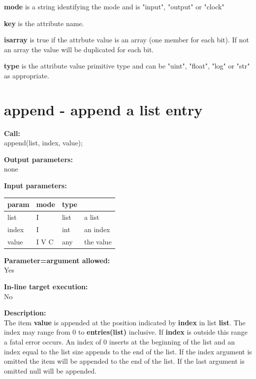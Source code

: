         {\bf mode} is a string identifying the mode and is "input", "output"
        or "clock"
        
        {\bf key} is the attribute name.
        
        {\bf isarray} is true if the attrbute value is an array (one member
        for each bit). If not an array the value will be duplicated for
        each bit.
        
        {\bf type} is the attribute value primitive type and can be "uint",
        "float", "log" or "str" as appropriate.



        
    \section{append - append a list entry}\label{sec:ipappend}
        
        {\bf Call:} \\
        append(list, index, value);
        
        {\bf Output parameters:} \\
        none
        
        {\bf Input parameters:} \\
        \begin{tabular}{| l | l | l | l |}
        \hline
        param  & mode & type & \\
        \hline \hline
        list   & I     & list & a list   \\ \hline
        index  & I     & int  & an index   \\ \hline
        value  & I V C & any  & the value   \\ \hline
        \end{tabular}
        
        {\bf Parameter=argument allowed:} \\
        Yes
        
        {\bf In-line target execution:} \\
        No
        
        {\bf Description:} \\
        The item {\bf value} is appended at the position indicated by {\bf
        index} in list {\bf list}. The index may range from 0 to {\bf
        entries(list)} inclusive. If {\bf index} is outside this range a fatal
        error occurs. An index of 0 inserts at the beginning of the list and
        an index equal to the list size appends to the end of the list. If
        the index argument is omitted the item will be appended to the end
        of the list. If the last argument is omitted null will be appended.
        
